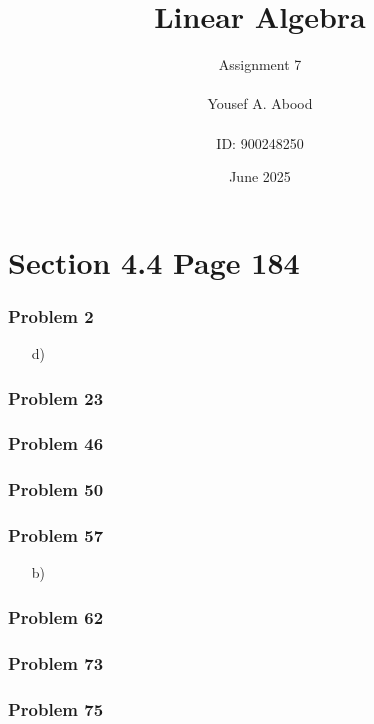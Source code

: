 \documentclass[a4paper,12pt]{article}
\title{Linear Algebra}
\author{Assignment 7\\ \\ Yousef A. Abood\\ \\ ID: 900248250}
\date{June 2025}
\begin{document}
\maketitle
\noindent\makebox[\linewidth]{\rule{15cm}{0.4pt}}

\section*{Section 4.4 Page 184}

\subsubsection*{Problem 2}
\begin{itemize}
    \item [d)]
\end{itemize}
\subsubsection*{Problem 23}

\subsubsection*{Problem 46}

\subsubsection*{Problem 50}

\subsubsection*{Problem 57}
\begin{itemize}
    \item [b)]
\end{itemize}
\subsubsection*{Problem 62}

\subsubsection*{Problem 73}

\subsubsection*{Problem 75}
\end{document}
